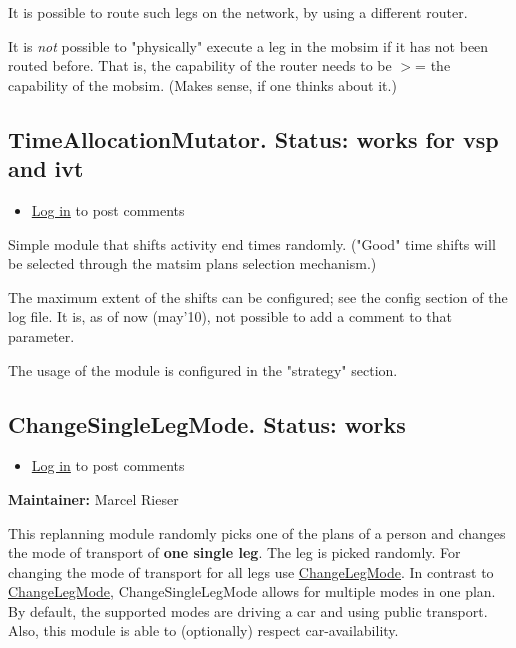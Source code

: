 \documentclass[a4paper,11pt]{report}
\begin{document}
It is possible to route such legs on the network, by using a different router.

It is \emph{not} possible to "physically" execute a leg in the  mobsim if it has not been routed before. That is, the capability  of the router needs to be $>$= the capability of the mobsim.  (Makes sense, if one thinks about it.)

\subsection{TimeAllocationMutator.  Status: works for vsp and ivt}
\begin{itemize}
	\item \href{http://www.matsim.org/user/login?destination=comment/reply/388%23comment-form}{Log in} to post comments
\end{itemize}

Simple  module that shifts activity end times randomly. ("Good" time  shifts will be selected through the matsim plans selection mechanism.)

The maximum extent of the shifts can be configured; see the config  section of the log file. It is, as of now (may'10), not possible  to add a comment to that parameter.

The usage of the module is configured in the "strategy" section.

\subsection{ ChangeSingleLegMode. Status: works}
\begin{itemize}
	\item \href{http://www.matsim.org/user/login?destination=comment/reply/736%23comment-form}{Log in} to post comments
\end{itemize}

\textbf{Maintainer:} Marcel Rieser

This replanning module randomly picks one of the plans of a person and changes the mode of transport of \textbf{one single leg}. The leg is picked randomly. For changing the mode of transport for all legs use \href{http://www.matsim.org/node/387}{ChangeLegMode}. In contrast to \href{http://www.matsim.org/node/387}{ChangeLegMode},  ChangeSingleLegMode allows for multiple modes in one plan. By default,  the supported modes are driving a car and using public transport. Also,  this module is able to (optionally) respect car-availability.
\end{document}
